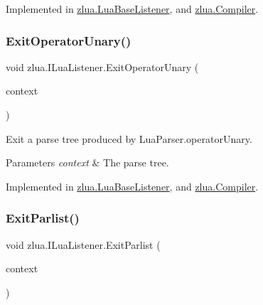 Implemented in \mbox{\hyperlink{classzlua_1_1_lua_base_listener_a120cd0798009d1b1574ac0ec556482a7}{zlua.\+Lua\+Base\+Listener}}, and \mbox{\hyperlink{classzlua_1_1_compiler_a320c32704688e1ba4705eb347b0e5701}{zlua.\+Compiler}}.

\mbox{\label{interfacezlua_1_1_i_lua_listener_ab4c9d1484b1f65d892ad588b7b01814e}} 
\subsubsection{\texorpdfstring{Exit\+Operator\+Unary()}{ExitOperatorUnary()}}
{\footnotesize\ttfamily void zlua.\+I\+Lua\+Listener.\+Exit\+Operator\+Unary (\begin{DoxyParamCaption}\item[{\mbox{[}\+Not\+Null\mbox{]} \mbox{\hyperlink{classzlua_1_1_lua_parser_1_1_operator_unary_context}{Lua\+Parser.\+Operator\+Unary\+Context}}}]{context }\end{DoxyParamCaption})}



Exit a parse tree produced by Lua\+Parser.\+operator\+Unary. 


\begin{DoxyParams}{Parameters}
{\em context} & The parse tree.\\
\hline
\end{DoxyParams}


Implemented in \mbox{\hyperlink{classzlua_1_1_lua_base_listener_a7c6d18b5d844f0af74c1123b245bc373}{zlua.\+Lua\+Base\+Listener}}, and \mbox{\hyperlink{classzlua_1_1_compiler_a345eb068591d3ef3beddc652b206e53f}{zlua.\+Compiler}}.

\mbox{\label{interfacezlua_1_1_i_lua_listener_a067b1e085ec7ffaab84c99f820ccd5fa}} 
\subsubsection{\texorpdfstring{Exit\+Parlist()}{ExitParlist()}}
{\footnotesize\ttfamily void zlua.\+I\+Lua\+Listener.\+Exit\+Parlist (\begin{DoxyParamCaption}\item[{\mbox{[}\+Not\+Null\mbox{]} \mbox{\hyperlink{classzlua_1_1_lua_parser_1_1_parlist_context}{Lua\+Parser.\+Parlist\+Context}}}]{context }\end{DoxyParamCaption})}



